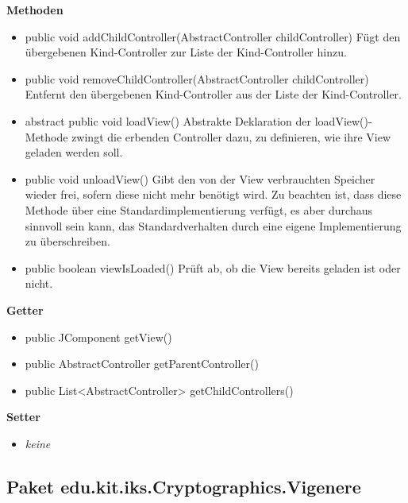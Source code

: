 \documentclass{article}
\begin{document}
      \textbf{Methoden}
      \begin{itemize}
        \item public void addChildController(AbstractController childController) \newline
          Fügt den übergebenen Kind-Controller zur Liste der Kind-Controller hinzu.
        
        \item public void removeChildController(AbstractController childController) \newline
          Entfernt den übergebenen Kind-Controller aus der Liste der Kind-Controller.
          
        \item abstract public void loadView() \newline
          Abstrakte Deklaration der loadView()-Methode zwingt die erbenden Controller dazu,
          zu definieren, wie ihre View geladen werden soll.
          
        \item public void unloadView() \newline
          Gibt den von der View verbrauchten Speicher wieder frei, sofern diese nicht mehr
          benötigt wird. Zu beachten ist, dass diese Methode über eine Standardimplementierung
          verfügt, es aber durchaus sinnvoll sein kann, das Standardverhalten durch eine
          eigene Implementierung zu überschreiben.
        
        \item public boolean viewIsLoaded() \newline
          Prüft ab, ob die View bereits geladen ist oder nicht.
      \end{itemize}
      
      \textbf{Getter}
      \begin{itemize}
        \item public JComponent getView()
        \item public AbstractController getParentController()
        \item public List<AbstractController> getChildControllers()
      \end{itemize}
      
      \textbf{Setter}
      \begin{itemize}
        \item \textit{keine}
      \end{itemize}
	
\subsection{Paket edu.kit.iks.Cryptographics.Vigenere}
\end{document}
